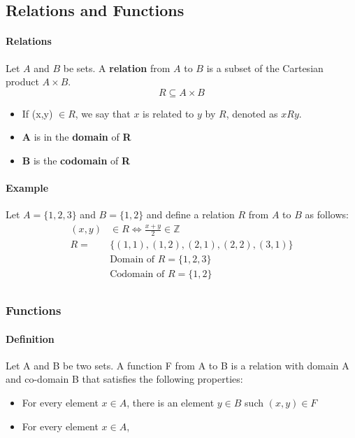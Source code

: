 \subsection{Relations and Functions}

\paragraph*{Relations}
Let $A$ and $B$ be sets. A \textbf{relation} from $A$ to $B$ is a subset of the Cartesian product $A\times B$.\\
\begin{equation*}
    R \subseteq A\times B
\end{equation*}
\begin{itemize}
    \item If (x,y) $\in R$, we say that $x$ is related to $y$ by $R$, denoted as $xRy$.
    \item \textbf{A} is in the \textbf{domain} of \textbf{R}
    \item \textbf{B} is the \textbf{codomain} of \textbf{R}
\end{itemize}

\paragraph*{Example}
Let $A = \{1,2,3\}$ and $B = \{1,2\}$ and define a relation $R$ from $A$ to $B$ as follows:
\begin{align*}
    (x,y) &\in R \iff \frac{x+y}{2} \in \mathbb{Z}\\
    R = &\{(1,1), (1,2), (2,1), (2,2), (3,1)\}\\
        &\text{Domain of } R = \{1,2,3\}\\
        &\text{Codomain of } R = \{1,2\}\\
\end{align*}

\pagebreak

\subsubsection*{Functions}
\paragraph*{Definition}
Let A and B be two sets. A function F from A to B is a relation with domain A and co-domain B that satisfies the following properties:
\begin{itemize}
    \item For every element $x \in A$, there is an element $y \in B$ such $(x,y) \in F$
    \item For every element $x \in A$,
\end{itemize}

